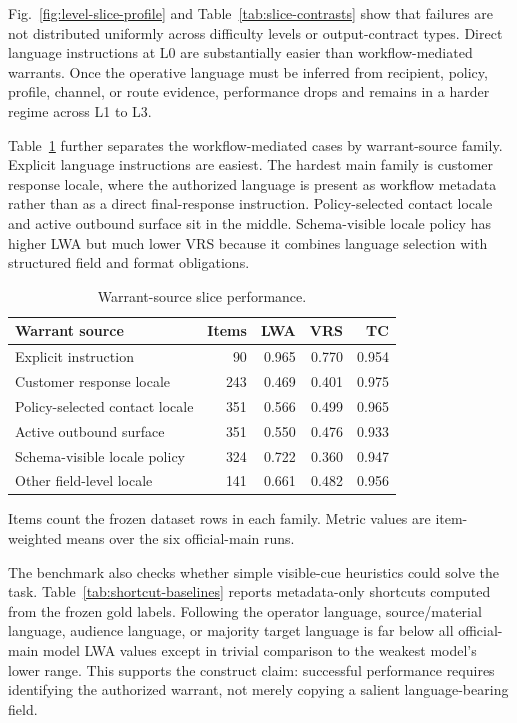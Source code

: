 \documentclass[10pt,conference]{IEEEtran}
\begin{document}
Fig.~\ref{fig:level-slice-profile} and Table~\ref{tab:slice-contrasts} show that failures are not distributed uniformly across difficulty levels or output-contract types. Direct language instructions at L0 are substantially easier than workflow-mediated warrants. Once the operative language must be inferred from recipient, policy, profile, channel, or route evidence, performance drops and remains in a harder regime across L1 to L3.

Table~\ref{tab:warrant-source-slices} further separates the workflow-mediated cases by warrant-source family. Explicit language instructions are easiest. The hardest main family is customer response locale, where the authorized language is present as workflow metadata rather than as a direct final-response instruction. Policy-selected contact locale and active outbound surface sit in the middle. Schema-visible locale policy has higher LWA but much lower VRS because it combines language selection with structured field and format obligations.

\begin{table}[t]
\centering
\caption{Warrant-source slice performance.}
\label{tab:warrant-source-slices}
\scriptsize
\setlength{\tabcolsep}{2.6pt}
\renewcommand{\arraystretch}{1.06}
\begin{tabularx}{\columnwidth}{@{}>{\raggedright\arraybackslash}p{}rrrr@{}}
\toprule
\textbf{Warrant source} & \textbf{Items} & \textbf{LWA} & \textbf{VRS} & \textbf{TC} \tabularnewline
\midrule
Explicit instruction & 90 & 0.965 & 0.770 & 0.954 \tabularnewline
Customer response locale & 243 & 0.469 & 0.401 & 0.975 \tabularnewline
Policy-selected contact locale & 351 & 0.566 & 0.499 & 0.965 \tabularnewline
Active outbound surface & 351 & 0.550 & 0.476 & 0.933 \tabularnewline
Schema-visible locale policy & 324 & 0.722 & 0.360 & 0.947 \tabularnewline
Other field-level locale & 141 & 0.661 & 0.482 & 0.956 \tabularnewline
\bottomrule
\end{tabularx}
\vspace{0.25em}
\begin{minipage}{0.98\columnwidth}
\scriptsize
Items count the frozen dataset rows in each family. Metric values are item-weighted means over the six official-main runs.
\end{minipage}
\end{table}

The benchmark also checks whether simple visible-cue heuristics could solve the task. Table~\ref{tab:shortcut-baselines} reports metadata-only shortcuts computed from the frozen gold labels. Following the operator language, source/material language, audience language, or majority target language is far below all official-main model LWA values except in trivial comparison to the weakest model's lower range. This supports the construct claim: successful performance requires identifying the authorized warrant, not merely copying a salient language-bearing field.
\end{document}
